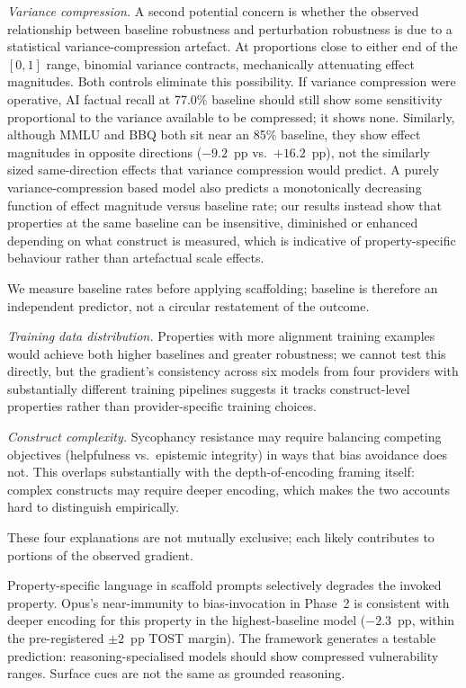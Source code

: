 \emph{Variance compression.}  A second potential concern is whether the observed relationship between baseline robustness and perturbation robustness is due to a statistical variance-compression artefact.  At proportions close to either end of the $[0, 1]$ range, binomial variance contracts, mechanically attenuating effect magnitudes.  Both controls eliminate this possibility.  If variance compression were operative, AI factual recall at 77.0\% baseline should still show some sensitivity proportional to the variance available to be compressed; it shows none.  Similarly, although MMLU and BBQ both sit near an 85\% baseline, they show effect magnitudes in opposite directions ($-9.2$~pp vs.\ $+16.2$~pp), not the similarly sized same-direction effects that variance compression would predict.  A purely variance-compression based model also predicts a monotonically decreasing function of effect magnitude versus baseline rate; our results instead show that properties at the same baseline can be insensitive, diminished or enhanced depending on what construct is measured, which is indicative of property-specific behaviour rather than artefactual scale effects.

We measure baseline rates before applying scaffolding; baseline is therefore an independent predictor, not a circular restatement of the outcome.

\emph{Training data distribution.}  Properties with more alignment training examples would achieve both higher baselines and greater robustness; we cannot test this directly, but the gradient's consistency across six models from four providers with substantially different training pipelines suggests it tracks construct-level properties rather than provider-specific training choices.

\emph{Construct complexity.}  Sycophancy resistance may require balancing competing objectives (helpfulness vs.\ epistemic integrity) in ways that bias avoidance does not.  This overlaps substantially with the depth-of-encoding framing itself: complex constructs may require deeper encoding, which makes the two accounts hard to distinguish empirically.

These four explanations are not mutually exclusive; each likely contributes to portions of the observed gradient.

Property-specific language in scaffold prompts selectively degrades the invoked property.  Opus's near-immunity to bias-invocation in Phase~2 is consistent with deeper encoding for this property in the highest-baseline model ($-2.3$~pp, within the pre-registered $\pm 2$~pp TOST margin).  The framework generates a testable prediction: reasoning-specialised models should show compressed vulnerability ranges.  Surface cues are not the same as grounded reasoning.

